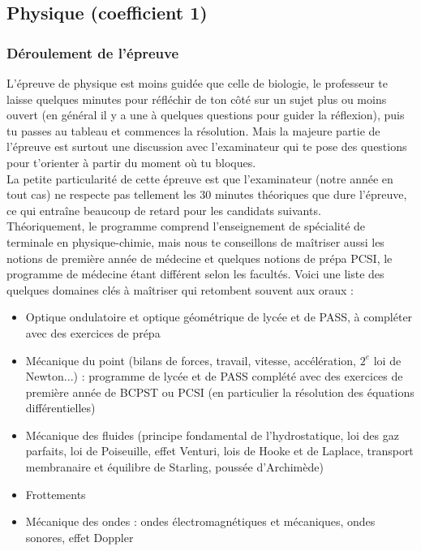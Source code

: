 \subsection{Physique (coefficient 1)}

\subsubsection{Déroulement de l'épreuve}

L’épreuve de physique est moins guidée que celle de biologie, le professeur te laisse quelques minutes pour réfléchir de ton côté sur un sujet plus ou moins ouvert (en général il y a une à quelques questions pour guider la réflexion), puis tu passes au tableau et commences la résolution. Mais la majeure partie de l’épreuve est surtout une discussion avec l’examinateur qui te pose des questions pour t'orienter à partir du moment où tu bloques.\\

La petite particularité de cette épreuve est que l’examinateur (notre année en tout cas) ne respecte pas tellement les 30 minutes théoriques que dure l’épreuve, ce qui entraîne beaucoup de retard pour les candidats suivants.\\

Théoriquement, le programme comprend l’enseignement de spécialité de terminale en physique-chimie, mais nous te conseillons de maîtriser aussi les notions de première année de médecine et quelques notions de prépa PCSI, le programme de médecine étant différent selon les facultés. Voici une liste des quelques domaines clés à maîtriser qui retombent souvent aux oraux :

\begin{itemize}
\item Optique ondulatoire et optique géométrique de lycée et de PASS, à compléter avec des exercices de prépa
\item Mécanique du point (bilans de forces, travail, vitesse, accélération, $2^e$ loi de Newton...) : programme de lycée et de PASS complété avec des exercices de première année de BCPST ou PCSI (en particulier la résolution des équations différentielles)
\item Mécanique des fluides (principe fondamental de l’hydrostatique, loi des gaz parfaits, loi de Poiseuille, effet Venturi, lois de Hooke et de Laplace, transport membranaire et équilibre de Starling, poussée d’Archimède)
\item Frottements
\item Mécanique des ondes : ondes électromagnétiques et mécaniques, ondes sonores, effet Doppler
\end{itemize}


